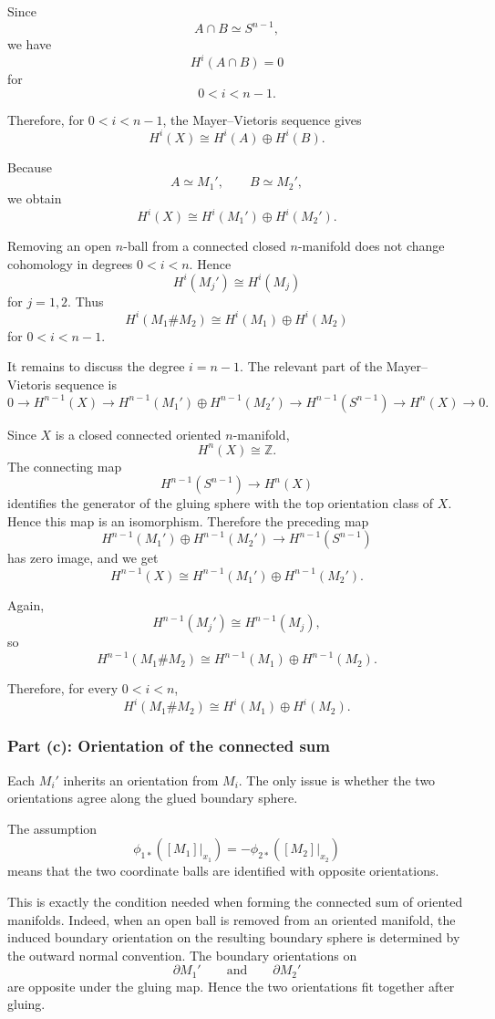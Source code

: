 \documentclass[12pt,a4paper]{article}
\theoremstyle{notespace}
\begin{document}
Since
\[
A\cap B\simeq S^{n-1},
\]
we have
\[
H^i(A\cap B)=0
\]
for
\[
0<i<n-1.
\]

Therefore, for \(0<i<n-1\), the Mayer--Vietoris sequence gives
\[
H^i(X)
\cong
H^i(A)\oplus H^i(B).
\]

Because
\[
A\simeq M_1',
\qquad
B\simeq M_2',
\]
we obtain
\[
H^i(X)
\cong
H^i(M_1')\oplus H^i(M_2').
\]

Removing an open \(n\)-ball from a connected closed \(n\)-manifold does not
change cohomology in degrees \(0<i<n\). Hence
\[
H^i(M_j')
\cong
H^i(M_j)
\]
for \(j=1,2\). Thus
\[
H^i(M_1\#M_2)
\cong
H^i(M_1)\oplus H^i(M_2)
\]
for \(0<i<n-1\).

It remains to discuss the degree \(i=n-1\). The relevant part of the
Mayer--Vietoris sequence is
\[
0
\longrightarrow
H^{n-1}(X)
\longrightarrow
H^{n-1}(M_1')\oplus H^{n-1}(M_2')
\longrightarrow
H^{n-1}(S^{n-1})
\longrightarrow
H^n(X)
\longrightarrow
0.
\]

Since \(X\) is a closed connected oriented \(n\)-manifold,
\[
H^n(X)\cong \mathbb{Z}.
\]
The connecting map
\[
H^{n-1}(S^{n-1})
\longrightarrow
H^n(X)
\]
identifies the generator of the gluing sphere with the top orientation
class of \(X\). Hence this map is an isomorphism. Therefore the preceding
map
\[
H^{n-1}(M_1')\oplus H^{n-1}(M_2')
\longrightarrow
H^{n-1}(S^{n-1})
\]
has zero image, and we get
\[
H^{n-1}(X)
\cong
H^{n-1}(M_1')\oplus H^{n-1}(M_2').
\]

Again,
\[
H^{n-1}(M_j')
\cong
H^{n-1}(M_j),
\]
so
\[
H^{n-1}(M_1\#M_2)
\cong
H^{n-1}(M_1)\oplus H^{n-1}(M_2).
\]

Therefore, for every \(0<i<n\),
\[
\boxed{
	H^i(M_1\#M_2)
	\cong
	H^i(M_1)\oplus H^i(M_2).
}
\]

\subsubsection*{Part (c): Orientation of the connected sum}

Each \(M_i'\) inherits an orientation from \(M_i\). The only issue is whether
the two orientations agree along the glued boundary sphere.

The assumption
\[
\phi_{1*}([M_1]|_{x_1})
=
-\phi_{2*}([M_2]|_{x_2})
\]
means that the two coordinate balls are identified with opposite
orientations.

This is exactly the condition needed when forming the connected sum of
oriented manifolds. Indeed, when an open ball is removed from an oriented
manifold, the induced boundary orientation on the resulting boundary sphere
is determined by the outward normal convention. The boundary orientations on
\[
\partial M_1'
\qquad\text{and}\qquad
\partial M_2'
\]
are opposite under the gluing map. Hence the two orientations fit together
after gluing.
\end{document}
